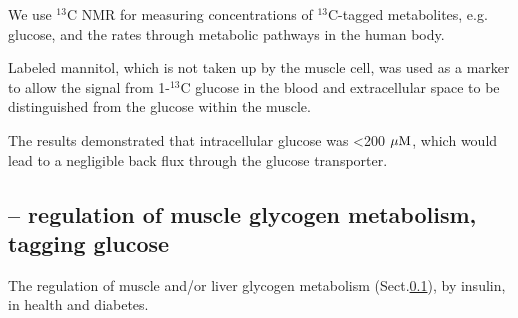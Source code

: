We use $^{13}$C NMR for measuring concentrations of $^{13}$C-tagged metabolites,
e.g. glucose, and the rates through metabolic pathways in the human body.

Labeled mannitol, which is not taken up by the muscle cell, was used as a marker
to allow the signal from 1-$^{13}$C glucose in the blood and extracellular space
to be distinguished from the glucose within the muscle.

The results demonstrated that intracellular glucose was <200 ${\mu\text{M}}$, which would
lead to a negligible back flux through the glucose transporter.




\subsection{-- regulation of muscle glycogen metabolism, tagging glucose}
\label{sec:glycogen}

The regulation of muscle and/or liver glycogen metabolism
(Sect.\ref{sec:glycogen}), by insulin, in health and diabetes.


